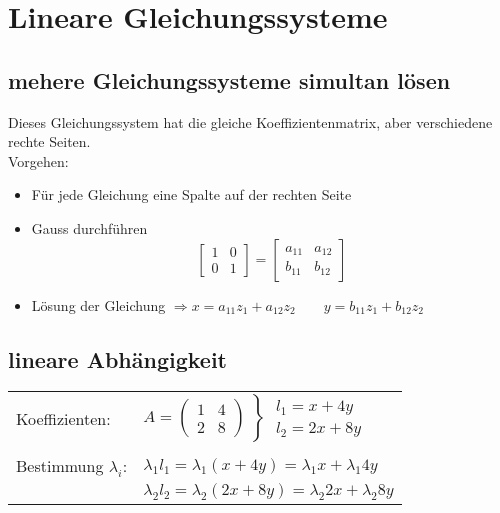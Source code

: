 \section{Lineare Gleichungssysteme}

\subsection{mehere Gleichungssysteme simultan lösen}
	Dieses Gleichungssystem hat die gleiche Koeffizientenmatrix, aber verschiedene rechte  Seiten.\\
	Vorgehen:
	\begin{itemize}
		\item Für jede Gleichung eine Spalte auf der rechten Seite
		\item Gauss durchführen
			\begin{equation*}
				\begin{bmatrix} 1 & 0 \\ 0 & 1 \end{bmatrix} =  \begin{bmatrix} a_{11} & a_{12} \\ b_{11} & b_{12} \end{bmatrix}	
			\end{equation*}
		\item Lösung der Gleichung $\Rightarrow x= a_{11}z_1 + a_{12}z_2 \qquad y= b_{11}z_1 + b_{12}z_2$
	\end{itemize}

\subsection{lineare Abhängigkeit}
	\begin{tabular}{ll}
		Koeffizienten: & $A = \left(\begin{array}{cc} 1 & 4\\ 2 & 8 \end{array}\right) \left\rbrace\begin{array}{l} l_1 = x +4y \\ l_2 = 2x + 8y \end{array}\right.$\\ \\
		Bestimmung $\lambda_i$:  &  $\lambda_1 l_1 = \lambda_1 (x + 4y) = \lambda_1 x + \lambda_1 4y$ \\
		& $\lambda_2 l_2 = \lambda_2 (2x + 8y) = \lambda_2 2x + \lambda_2 8y$
	\end{tabular} \\ \\
	
